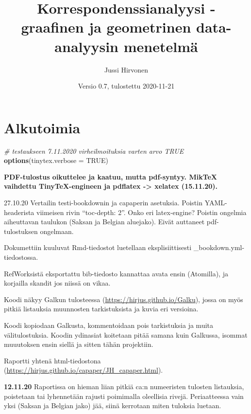 \documentclass[
  finnish,
]{book}
\title{Korrespondenssianalyysi - graafinen ja geometrinen data-analyysin menetelmä}
\author{Jussi Hirvonen}
\date{Versio 0.7, tulostettu 2020-11-21}
\newenvironment{Shaded}{\begin{snugshade}}{\end{snugshade}}
\newcommand{\CommentTok}[1]{\textcolor[rgb]{0.56,0.35,0.01}{\textit{#1}}}
\newcommand{\DataTypeTok}[1]{\textcolor[rgb]{0.13,0.29,0.53}{#1}}
\newcommand{\KeywordTok}[1]{\textcolor[rgb]{0.13,0.29,0.53}{\textbf{#1}}}
\newcommand{\NormalTok}[1]{#1}
\newcommand{\OtherTok}[1]{\textcolor[rgb]{0.56,0.35,0.01}{#1}}
\begin{document}
\maketitle

{
\setcounter{tocdepth}{1}
\tableofcontents
}
\hypertarget{alkutoimia}{%
\chapter*{Alkutoimia}\label{alkutoimia}}

\begin{Shaded}
\begin{Highlighting}[]
\CommentTok{# testaukseen 7.11.2020 virheilmoituksia varten arvo TRUE}
\KeywordTok{options}\NormalTok{(}\DataTypeTok{tinytex.verbose =} \OtherTok{TRUE}\NormalTok{)}
\end{Highlighting}
\end{Shaded}

\textbf{PDF-tulostus oikuttelee ja kaatuu, mutta pdf-syntyy. MikTeX vaihdettu TinyTeX-engineen ja pdflatex -\textgreater{} xelatex (15.11.20).}

27.10.20 Vertailin testi-bookdownin ja capaperin asetuksia.
Poistin YAML-headerista viimeisen rivin ``toc-depth: 2''. Onko eri latex-engine?
Poistin ongelmia aiheuttavan taulukon (Saksan ja Belgian aluejako).
Eivät auttaneet pdf-tulostuksen ongelmaan.

Dokumettiin kuuluvat Rmd-tiedostot luetellaan eksplisiittisesti
\_bookdown.yml-tiedostossa.

RefWorksistä eksportattu bib-tiedosto kannattaa avata ensin (Atomilla),
ja korjailla skandit jos niissä on vikaa.

Koodi näkyy Galkun tulosteessa (\url{https://hirjus.github.io/Galku}), jossa on myös
pitkiä listauksia muunnosten tarkistuksista ja kuvia eri versioina.

Koodi kopiodaan Galkusta, kommentoidaan pois tarkistuksia ja muita välitulostuksia.
Koodin ydinasiat koitetaan pitää samana kuin Galkussa, isommat muuutoksen ensin siellä
ja sitten tähän projektiin.

Raportti yhtenä html-tiedostona (\url{https://hirjus.github.io/capaper/JH_capaper.html}).

\textbf{12.11.20}
Raportissa on hieman liian pitkiä ca:n numeeristen tulosten listauksia, poistetaan tai
lyhennetään rajusti poimimalla oleellisia rivejä. Periaatteessa vain yksi (Saksan ja Belgian jako)
jää, siinä kerrotaan miten tuloksia luetaan.
\end{document}
